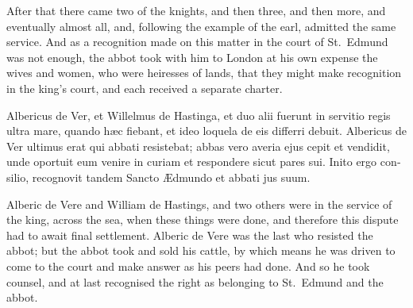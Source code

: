 \documentclass{book}
\begin{document}
\begin{paracol}{2}
\switchcolumn

After that there came two of the knights, and then three, and then more, and eventually almost all, and, following the example of the earl, admitted the same service. And as a recognition made on this matter in the court of St.\ Edmund was not enough, the abbot took with him to London at his own expense the wives and women, who were heiresses of lands, that they might make recognition in the king's court, and each received a separate charter.

\switchcolumn*

\begin{otherlanguage}{latin}
Albericus de Ver, et Willelmus de Hastinga, et duo alii fuerunt in servitio regis ultra mare, quando h\ae{}c fiebant, et ideo loquela de eis differri debuit. Albericus de Ver ultimus erat qui abbati resistebat; abbas vero averia ejus cepit et vendidit, unde oportuit eum venire in curiam et respondere sicut pares sui. Inito ergo consilio, recognovit tandem Sancto \AE{}dmundo et abbati jus suum.
\end{otherlanguage}

\switchcolumn

Alberic de Vere and William de Hastings, and two others were in the service of the king, across the sea, when these things were done, and therefore this dispute had to await final settlement. Alberic de Vere was the last who resisted the abbot; but the abbot took and sold his cattle, by which means he was driven to come to the court and make answer as his peers had done. And so he took counsel, and at last recognised the right as belonging to St.\ Edmund and the abbot.

\switchcolumn*


\end{paracol}
\end{document}

